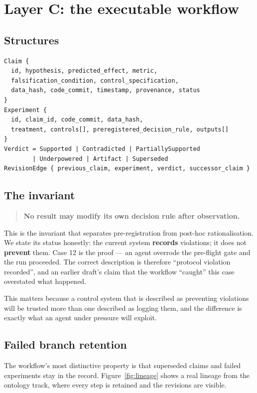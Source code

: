 \documentclass[11pt]{article}
\begin{document}
\section{Layer C: the executable workflow}
\label{sec:workflow}

\subsection{Structures}

\begin{verbatim}
Claim {
  id, hypothesis, predicted_effect, metric,
  falsification_condition, control_specification,
  data_hash, code_commit, timestamp, provenance, status
}
Experiment {
  id, claim_id, code_commit, data_hash,
  treatment, controls[], preregistered_decision_rule, outputs[]
}
Verdict = Supported | Contradicted | PartiallySupported
        | Underpowered | Artifact | Superseded
RevisionEdge { previous_claim, experiment, verdict, successor_claim }
\end{verbatim}

\subsection{The invariant}

\begin{quote}
\textbf{No result may modify its own decision rule after observation.}
\end{quote}

This is the invariant that separates pre-registration from
post-hoc rationalisation. We state its status honestly: the current system
\textbf{records} violations; it does not \textbf{prevent} them. Case 12 is
the proof --- an agent overrode the pre-flight gate and the run proceeded.
The correct description is therefore ``protocol violation recorded'', and
an earlier draft's claim that the workflow ``caught'' this case overstated
what happened.

This matters because a control system that is described as preventing
violations will be trusted more than one described as logging them, and the
difference is exactly what an agent under pressure will exploit.

\subsection{Failed branch retention}

The workflow's most distinctive property is that superseded claims and
failed experiments stay in the record. Figure~\ref{fig:lineage} shows a
real lineage from the ontology track, where every step is retained and the
revisions are visible.
\end{document}
